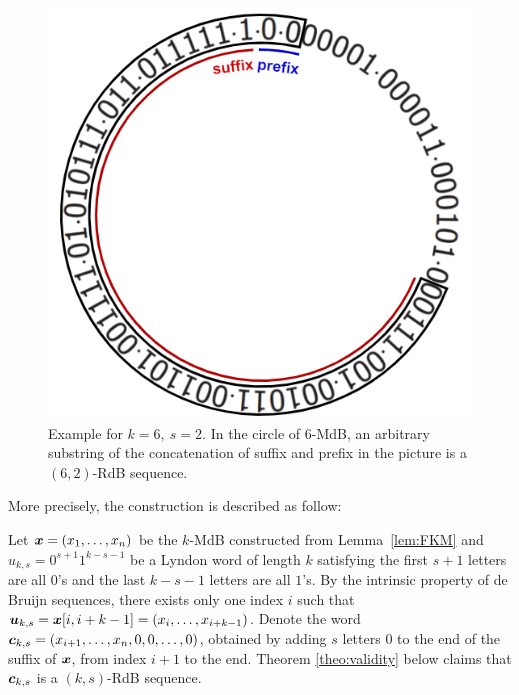 \begin{figure}[htbp]
    \centering
    \includegraphics[scale=0.5]{fig/construction/subtring of cyclic.png}
    \caption{Example for $k=6,\ s=2$. In the circle of $6$-MdB, an arbitrary substring of the concatenation of suffix and prefix in the picture is a $(6,2)$-RdB sequence.}
    \label{fig:substring_of_circle}
\end{figure}

%     

More precisely, the construction is described as follow:
\begin{construction}\label{constr:encoder}
    Let ${\boldsymbol x}=(x_{1},\ldots,x_{n})$ be the $k$-MdB constructed from Lemma~\ref{lem:FKM} and $u_{k,s}= 0^{s+1}1^{k-s-1}$ be a Lyndon word of length $k$ satisfying the first $s+1$ letters are all $0$'s and the last $k-s-1$ letters are all $1$'s. By the intrinsic property of de Bruijn sequences, there exists only one index $i$ such that ${\boldsymbol u}_{k,s}={\boldsymbol x}[i,i+k-1]=(x_{i},\ldots,x_{i+k-1})$. Denote the word ${\boldsymbol c}_{k,s} = (x_{i+1},\ldots,x_{n},0,0,\ldots,0)$, obtained by adding $s$ letters $0$ to the end of the suffix of ${\boldsymbol x}$, from index $i+1$ to the end. Theorem \ref{theo:validity} below claims that ${\boldsymbol c}_{k,s}$ is a $(k,s)$-RdB sequence. 
\end{construction}

